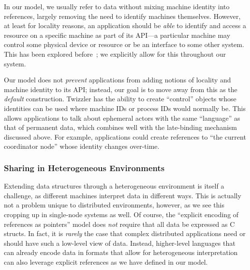 {    In our model, we usually refer to data without mixing machine identity into references,
    largely removing the need to identify machines themselves.
    However, at least for locality reasons,
    an application should be \emph{able} to identify and access a resource on a
    specific machine as part of its API---a particular
    machine may control some physical device or resource or be an interface to some other system. This
    has been explored before~\cite{ousterhout:computer88,grapevine}; we explicitly allow for this
    throughout our system.

    Our model does not \emph{prevent} applications from adding notions of locality and
    machine identity to its API; instead, our goal is to move away from this as the \emph{default}
    construction.
    Twizzler has the ability to create ``control'' objects whose identities can be used
    where machine IDs or process IDs would normally be. This allows applications to talk about ephemeral
    actors with the same ``language'' as that of permanent data, which combines well with the
    late-binding mechanism discussed above. For example, applications could create references to ``the
    current coordinator node'' whose identity changes over-time.

    \subsubsection{Sharing in Heterogeneous Environments}

    Extending data structures through a heterogeneous environment is itself a challenge, as different
    machines interpret data in different ways. This is actually not a problem unique to distributed
    environments, however, as we see this cropping up in single-node systems as well. Of course, the
    ``explicit encoding of references as pointers'' model does \emph{not} require that all data be
    expressed as C structs. In fact, it is \emph{rarely} the case that complex distributed applications
    need or should have such a low-level view of data. Instead, higher-level languages that can already
    encode data in formats that allow for heterogeneous interpretation can also leverage explicit
    references as we have defined in our model.
}



